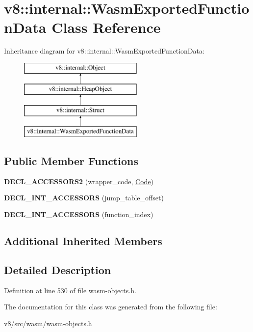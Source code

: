 \hypertarget{classv8_1_1internal_1_1WasmExportedFunctionData}{}\section{v8\+:\+:internal\+:\+:Wasm\+Exported\+Function\+Data Class Reference}
\label{classv8_1_1internal_1_1WasmExportedFunctionData}
Inheritance diagram for v8\+:\+:internal\+:\+:Wasm\+Exported\+Function\+Data\+:\begin{figure}[H]
\begin{center}
\leavevmode
\includegraphics[height=4.000000cm]{classv8_1_1internal_1_1WasmExportedFunctionData}
\end{center}
\end{figure}
\subsection*{Public Member Functions}
\begin{DoxyCompactItemize}
\item 
\mbox{\label{classv8_1_1internal_1_1WasmExportedFunctionData_a4f8c69f86442335bdc1c420a322e6981}} 
{\bfseries D\+E\+C\+L\+\_\+\+A\+C\+C\+E\+S\+S\+O\+R\+S2} (wrapper\+\_\+code, \mbox{\hyperlink{classv8_1_1internal_1_1Code}{Code}})
\item 
\mbox{\label{classv8_1_1internal_1_1WasmExportedFunctionData_ae19fa2fc21e9a39e797877c24f5ca62d}} 
{\bfseries D\+E\+C\+L\+\_\+\+I\+N\+T\+\_\+\+A\+C\+C\+E\+S\+S\+O\+RS} (jump\+\_\+table\+\_\+offset)
\item 
\mbox{\label{classv8_1_1internal_1_1WasmExportedFunctionData_ac4cb564017299cbacdb218a21ffb8e19}} 
{\bfseries D\+E\+C\+L\+\_\+\+I\+N\+T\+\_\+\+A\+C\+C\+E\+S\+S\+O\+RS} (function\+\_\+index)
\end{DoxyCompactItemize}
\subsection*{Additional Inherited Members}


\subsection{Detailed Description}


Definition at line 530 of file wasm-\/objects.\+h.



The documentation for this class was generated from the following file\+:\begin{DoxyCompactItemize}
\item 
v8/src/wasm/wasm-\/objects.\+h\end{DoxyCompactItemize}
